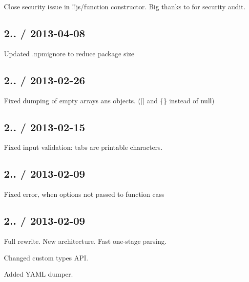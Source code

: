 
\begin{DoxyItemize}
\item Close security issue in !!js/function constructor. Big thanks to  for security audit.
\end{DoxyItemize}

\subsection*{2.. / 2013-\/04-\/08 }


\begin{DoxyItemize}
\item Updated .npmignore to reduce package size
\end{DoxyItemize}

\subsection*{2.. / 2013-\/02-\/26 }


\begin{DoxyItemize}
\item Fixed dumping of empty arrays ans objects. (\mbox{[}\mbox{]} and \{\} instead of null)
\end{DoxyItemize}

\subsection*{2.. / 2013-\/02-\/15 }


\begin{DoxyItemize}
\item Fixed input validation\+: tabs are printable characters.
\end{DoxyItemize}

\subsection*{2.. / 2013-\/02-\/09 }


\begin{DoxyItemize}
\item Fixed error, when options not passed to function cass
\end{DoxyItemize}

\subsection*{2.. / 2013-\/02-\/09 }


\begin{DoxyItemize}
\item Full rewrite. New architecture. Fast one-\/stage parsing.
\item Changed custom types A\+PI.
\item Added Y\+A\+ML dumper.
\end{DoxyItemize}

